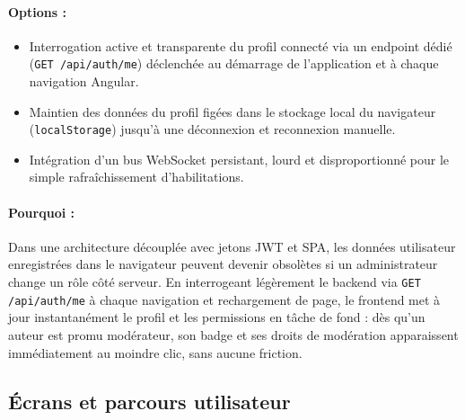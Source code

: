 \documentclass[11pt,a4paper]{article}
\begin{document}
\paragraph{Options :}
\begin{itemize}
    \item[$\boxtimes$] Interrogation active et transparente du profil connecté via un endpoint dédié (\texttt{GET /api/auth/me}) déclenchée au démarrage de l'application et à chaque navigation Angular.
    \item[$\square$] Maintien des données du profil figées dans le stockage local du navigateur (\texttt{localStorage}) jusqu'à une déconnexion et reconnexion manuelle.
    \item[$\square$] Intégration d'un bus WebSocket persistant, lourd et disproportionné pour le simple rafraîchissement d'habilitations.
\end{itemize}
\paragraph{Pourquoi :} Dans une architecture découplée avec jetons JWT et SPA, les données utilisateur enregistrées dans le navigateur peuvent devenir obsolètes si un administrateur change un rôle côté serveur. En interrogeant légèrement le backend via \texttt{GET /api/auth/me} à chaque navigation et rechargement de page, le frontend met à jour instantanément le profil et les permissions en tâche de fond : dès qu'un auteur est promu modérateur, son badge et ses droits de modération apparaissent immédiatement au moindre clic, sans aucune friction.

\subsection{Écrans et parcours utilisateur}
\end{document}

